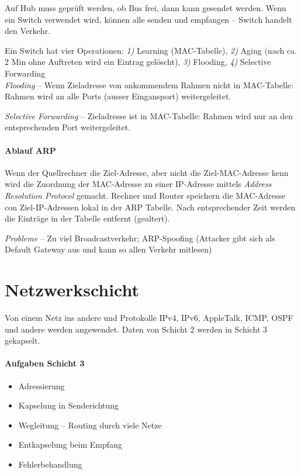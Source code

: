 \documentclass[a4paper,12pt]{article}
\begin{document}
Auf Hub muss geprüft werden, ob Bus frei, dann kann gesendet werden. Wenn ein Switch verwendet wird, können alle senden und empfangen -- Switch handelt den Verkehr.

Ein Switch hat vier Operationen: \emph{1)} Learning (MAC-Tabelle), \emph{2)} Aging (nach ca. 2 Min ohne Auftreten wird ein Eintrag gelöscht), \emph{3)} Flooding, \emph{4)} Selective Forwarding \\

\emph{Flooding} -- Wenn Zieladresse von ankommendem Rahmen nicht in MAC-Tabelle: Rahmen wird an alle Ports (ausser Eingansport) weitergeleitet.

\emph{Selective Forwarding} -- Zieladresse ist in MAC-Tabelle: Rahmen wird nur an den entsprechenden Port weitergeleitet.

\newpage
\paragraph{Ablauf ARP}
Wenn der Quellrechner die Ziel-Adresse, aber nicht die Ziel-MAC-Adresse kenn wird die Zuordnung der MAC-Adresse zu einer IP-Adresse mittels \emph{Address Resolution Protocol} gemacht. Rechner und Router speichern die MAC-Adresse con Ziel-IP-Adressen lokal in der ARP Tabelle. Nach entsprechender Zeit werden die Einträge in der Tabelle entfernt (gealtert).

\emph{Probleme} -- Zu viel Broadcastverkehr; ARP-Spoofing (Attacker gibt sich als Default Gateway aus und kann so allen Verkehr mitlesen)


\newpage
\section{Netzwerkschicht} 
Von einem Netz ins andere und Protokolle IPv4, IPv6, AppleTalk, ICMP, OSPF und andere werden angewendet. Daten von Schicht 2 werden in Schicht 3 gekapselt.

\paragraph{Aufgaben Schicht 3}
\begin{itemize}
\item Adressierung
\item Kapselung in Senderichtung
\item Wegleitung -- Routing durch viele Netze
\item Entkapselung beim Empfang
\item Fehlerbehandlung
\end{itemize}
\end{document}
